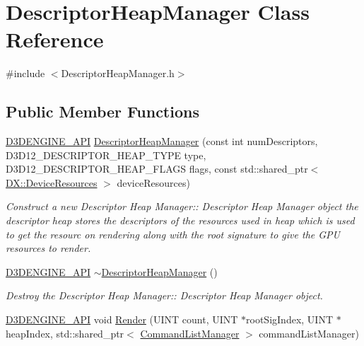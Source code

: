 \hypertarget{class_descriptor_heap_manager}{}\section{Descriptor\+Heap\+Manager Class Reference}
\label{class_descriptor_heap_manager}


{\ttfamily \#include $<$Descriptor\+Heap\+Manager.\+h$>$}

\subsection*{Public Member Functions}
\begin{DoxyCompactItemize}
\item 
\mbox{\hyperlink{stdafx_8h_a8ee2d990c5dfba7794dd2b60741d7722}{D3\+D\+E\+N\+G\+I\+N\+E\+\_\+\+A\+PI}} \mbox{\hyperlink{class_descriptor_heap_manager_a0f9384d42ee90d6207e64b0b8f24123b}{Descriptor\+Heap\+Manager}} (const int num\+Descriptors, D3\+D12\+\_\+\+D\+E\+S\+C\+R\+I\+P\+T\+O\+R\+\_\+\+H\+E\+A\+P\+\_\+\+T\+Y\+PE type, D3\+D12\+\_\+\+D\+E\+S\+C\+R\+I\+P\+T\+O\+R\+\_\+\+H\+E\+A\+P\+\_\+\+F\+L\+A\+GS flags, const std\+::shared\+\_\+ptr$<$ \mbox{\hyperlink{class_d_x_1_1_device_resources}{D\+X\+::\+Device\+Resources}} $>$ device\+Resources)
\begin{DoxyCompactList}\small\item\em Construct a new Descriptor Heap Manager\+:\+: Descriptor Heap Manager object the descriptor heap stores the descriptors of the resources used in heap which is used to get the resourc on rendering along with the root signature to give the G\+PU resources to render. \end{DoxyCompactList}\item 
\mbox{\hyperlink{stdafx_8h_a8ee2d990c5dfba7794dd2b60741d7722}{D3\+D\+E\+N\+G\+I\+N\+E\+\_\+\+A\+PI}} \mbox{\hyperlink{class_descriptor_heap_manager_afb06cc02997f44f9e6d651d229358dd2}{$\sim$\+Descriptor\+Heap\+Manager}} ()
\begin{DoxyCompactList}\small\item\em Destroy the Descriptor Heap Manager\+:\+: Descriptor Heap Manager object. \end{DoxyCompactList}\item 
\mbox{\hyperlink{stdafx_8h_a8ee2d990c5dfba7794dd2b60741d7722}{D3\+D\+E\+N\+G\+I\+N\+E\+\_\+\+A\+PI}} void \mbox{\hyperlink{class_descriptor_heap_manager_af5ad3ea476bd56e9f9b8d37e2c3a452d}{Render}} (U\+I\+NT count, U\+I\+NT $\ast$root\+Sig\+Index, U\+I\+NT $\ast$heap\+Index, std\+::shared\+\_\+ptr$<$ \mbox{\hyperlink{class_command_list_manager}{Command\+List\+Manager}} $>$ command\+List\+Manager)

\end{DoxyCompactItemize}

